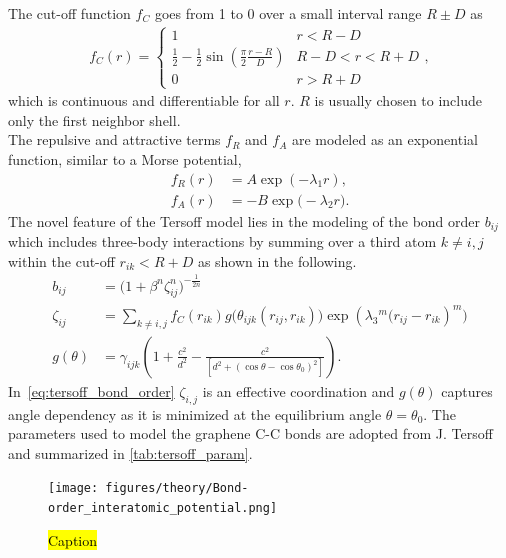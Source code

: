 The cut-off function $f_C$ goes from 1 to 0 over a small interval range $R \pm
D$ as
\begin{align*}
  f_C(r) =
  \begin{cases}
    1 & r < R - D \\
    \frac{1}{2} - \frac{1}{2} \sin{(\frac{\pi}{2} \frac{r - R}{D})} & R - D < r < R + D\\
    0 & r > R + D
  \end{cases},
\end{align*}
which is continuous and differentiable for all $r$. $R$ is usually chosen to
include only the first neighbor shell. \\
The repulsive and attractive terms $f_R$ and $f_A$ are modeled as an exponential function, similar to a Morse potential, 
\begin{align*}
 f_R(r) &= A \exp(-\lambda_1 r), \\
 f_A(r) &= -B \exp \big(-\lambda_2 r\big).
\end{align*}
The novel feature of the Tersoff model lies in the modeling of the bond order
$b_{ij}$ which includes three-body interactions by summing over a third atom $k
\ne i,j$ within the cut-off $r_{ik} < R + D$ as shown in the following.
\begin{align}
  b_{i j} & =\big(1+\beta^n \zeta_{i j}^n\big)^{-\frac{1}{2 n}} \\
  \zeta_{i j} & =\sum_{k \ne i,j} f_C(r_{i k}) g\Big(\theta_{i j k}\left(r_{i j}, r_{i k}\right)\Big) \exp \left(\lambda_3{ }^m\big(r_{i j}-r_{i k}\right)^m\big) \\
  g(\theta) & =\gamma_{i j k}\left(1+\frac{c^2}{d^2}-\frac{c^2}{\left[d^2+\left(\cos \theta-\cos \theta_0\right)^2\right]}\right).
  \label{eq:tersoff_bond_order}
\end{align}
In~\cref{eq:tersoff_bond_order} $\zeta_{i,j}$ is an effective coordination and
$g(\theta)$ captures angle dependency as it is minimized at the equilibrium
angle $\theta = \theta_0$. The parameters used to model the graphene C-C bonds
are adopted from J. Tersoff \cite{PhysRevB.39.5566} and summarized in
\cref{tab:tersoff_param}.


\begin{figure}[H]
  \centering
  \texttt{[image: figures/theory/Bond-order\_interatomic\_potential.png]}
  \caption{\hl{Caption} \cite{wiki:bond_order}}
  \label{fig:bond_order}
\end{figure}



